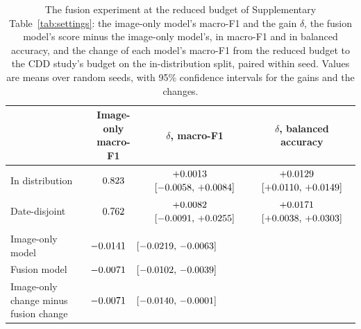 \documentclass[11pt]{article}
\begin{document}
\begin{table}[H]
\centering
\scriptsize
\caption{The fusion experiment at the reduced budget of Supplementary
Table~\ref{tab:settings}: the image-only model's macro-F1 and the gain $\delta$, the
fusion model's score minus the image-only model's, in macro-F1 and in balanced
accuracy, and the change of each model's macro-F1 from the reduced budget to the
CDD study's budget on the in-distribution split, paired within seed. Values are
means over \fusionSeeds{} random seeds, with 95\% confidence intervals for the gains
and the changes.}
\label{tab:fusion-reduced}
\begin{tabular}{>{\raggedright\arraybackslash}p{}ccc}
\toprule
 & Image-only macro-F1 & $\delta$, macro-F1 & $\delta$, balanced accuracy \\
\midrule
In distribution & $0.823{}$ & $+0.0013{}$~~$[-0.0058,\,+0.0084]{}$ & $+0.0129{}$~~$[+0.0110,\,+0.0149]{}$ \\
Date-disjoint & $0.762{}$ & $+0.0082{}$~~$[-0.0091,\,+0.0255]{}$ & $+0.0171{}$~~$[+0.0038,\,+0.0303]{}$ \\
\midrule
\multicolumn{4}{l}{\emph{Change of macro-F1 from the reduced budget to the study's budget}} \\
Image-only model & \multicolumn{3}{l}{$-0.0141{}$~~$[-0.0219,\,-0.0063]{}$} \\
Fusion model & \multicolumn{3}{l}{$-0.0071{}$~~$[-0.0102,\,-0.0039]{}$} \\
Image-only change minus fusion change & \multicolumn{3}{l}{$-0.0071{}$~~$[-0.0140,\,-0.0001]{}$} \\
\bottomrule
\end{tabular}
\end{table}

\begin{table}[H]
\centering
\scriptsize
\caption{Margins of three pairs of AI Hub classifiers per crop, untuned forests.
Values are means over \numSeeds{} random seeds, with 95\% confidence intervals of the
difference paired within seed. An asterisk marks a margin whose paired $t$-test
survives Holm's correction across the \timestampCrops{} crops.}
\label{tab:margins}

\end{table}

\begin{table}[H]
\centering
\scriptsize
\caption{The margins of Table~\ref{tab:margins} with every forest
tuned by the grid search of Table~\ref{tab:settings}.}
\label{tab:tuned}

\end{table}
\end{document}
